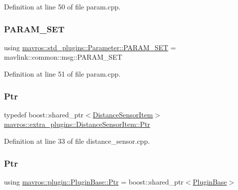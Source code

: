 Definition at line 50 of file param.\+cpp.

\mbox{\label{group__plugin_gaa94f933e0249802ee1985cb650408c31}} 
\subsubsection{\texorpdfstring{PARAM\_SET}{PARAM\_SET}}
{\footnotesize\ttfamily using \mbox{\hyperlink{group__plugin_gaa94f933e0249802ee1985cb650408c31}{mavros\+::std\+\_\+plugins\+::\+Parameter\+::\+P\+A\+R\+A\+M\+\_\+\+S\+ET}} =  mavlink\+::common\+::msg\+::\+P\+A\+R\+A\+M\+\_\+\+S\+ET}



Definition at line 51 of file param.\+cpp.

\mbox{\label{group__plugin_ga0156f4cebc73c6f4b88d5a4053e98c2b}} 
\subsubsection{\texorpdfstring{Ptr}{Ptr}\hspace{0.1cm}{\footnotesize\ttfamily [1/2]}}
{\footnotesize\ttfamily typedef boost\+::shared\+\_\+ptr$<$\mbox{\hyperlink{classmavros_1_1extra__plugins_1_1DistanceSensorItem}{Distance\+Sensor\+Item}}$>$ \mbox{\hyperlink{group__plugin_ga0156f4cebc73c6f4b88d5a4053e98c2b}{mavros\+::extra\+\_\+plugins\+::\+Distance\+Sensor\+Item\+::\+Ptr}}}



Definition at line 33 of file distance\+\_\+sensor.\+cpp.

\mbox{\label{group__plugin_ga61d4cf3cc97503da0157ead2ac68dc47}} 
\subsubsection{\texorpdfstring{Ptr}{Ptr}\hspace{0.1cm}{\footnotesize\ttfamily [2/2]}}
{\footnotesize\ttfamily using \mbox{\hyperlink{group__plugin_ga61d4cf3cc97503da0157ead2ac68dc47}{mavros\+::plugin\+::\+Plugin\+Base\+::\+Ptr}} =  boost\+::shared\+\_\+ptr$<$\mbox{\hyperlink{classmavros_1_1plugin_1_1PluginBase}{Plugin\+Base}}$>$}



